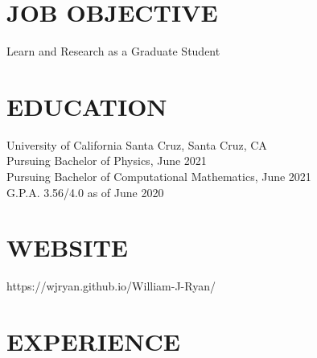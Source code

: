 \documentclass{res}
\begin{document}
 


\address{\bf  PRESENT ADDRESS\\522 14th ave.\\Santa Cruz, CA 95062\\(831) 428-6558}
                                  
\begin{resume}

\section{JOB OBJECTIVE}          
    Learn and Research as a Graduate Student 
 
\section{EDUCATION}          
    University of California Santa Cruz, Santa Cruz, CA  \\        
    Pursuing Bachelor of Physics, June 2021   \\ 
    Pursuing Bachelor of Computational Mathematics, June 2021	  \\              
    G.P.A. 3.56/4.0 as of June 2020         

\section{WEBSITE}
	https://wjryan.github.io/William-J-Ryan/
 
\section{EXPERIENCE}
   \vspace{-0.1in}	


\end{resume}
\end{document}
